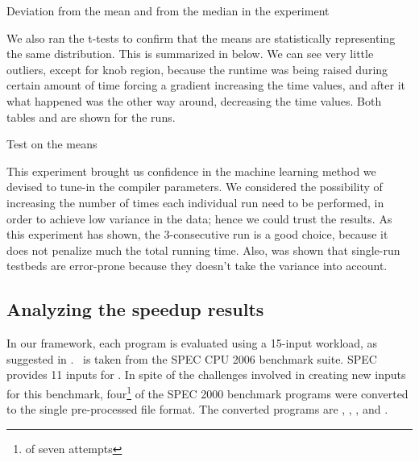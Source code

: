 \begin{table}
  \centering
  \begin{tiny}
  
  \end{tiny}
  \caption{Deviation from the mean and from the median in the experiment}
  \label{tab:simStats}
\end{table}

We also ran the t-tests to confirm that the means are statistically representing the same distribution. This is summarized in  below. We can see very little outliers, except for knob region, because the runtime was being raised during certain amount of time forcing a gradient increasing the time values, and after it what happened was the other way around, decreasing the time values. Both tables  and  are shown for the runs.

\begin{table}
  \centering
  \begin{tiny}
  
  \end{tiny}
  \caption{Test on the means}
  \label{tab:statTest}
\end{table}

This experiment brought us confidence in the machine learning method we devised to tune-in the compiler parameters. We considered the possibility of increasing the number of times each individual run need to be performed, in order to achieve low variance in the data; hence we could trust the results. As this experiment has shown, the $3$-consecutive run is a good choice, because it does not penalize much the total running time. Also, was shown that single-run testbeds are error-prone because they doesn't take the variance into account.

\subsection{Analyzing the speedup results}

In our framework, each program is evaluated using a 15-input workload, as suggested in \cite{BerubePhD}. \Gcc\ is taken from the SPEC CPU 2006 benchmark suite.  SPEC provides 11 inputs for \gcc. In spite of the challenges involved in creating new inputs for this benchmark, four\footnote{of seven attempts} of the SPEC 2000 benchmark programs were converted to the single pre-processed file format. The converted programs are \bzip, \lbm, \mcf, and \parser.

